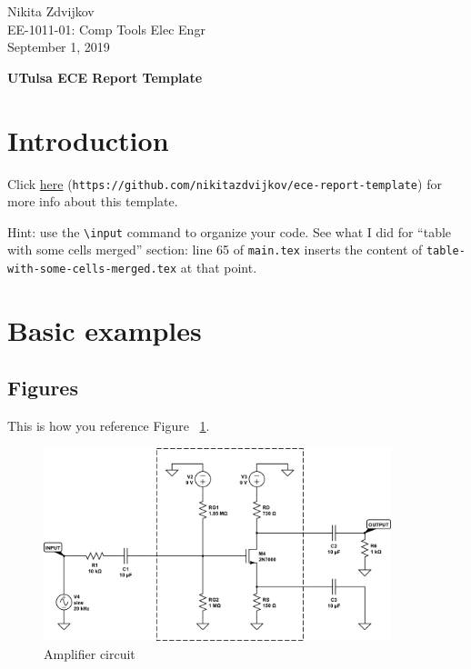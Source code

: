\documentclass[letterpaper,twoside,notitlepage,12pt]{article}
\begin{document}
\noindent
Nikita Zdvijkov \\
EE-1011-01: Comp Tools Elec Engr \\
September 1, 2019

\begin{center}
\large{\textbf{UTulsa ECE Report Template}}
\end{center}

\section{Introduction}

Click \href{https://github.com/nikitazdvijkov/ece-report-template}{here} (\texttt{https://github.com/nikitazdvijkov/ece-report-template}) for more info about this template.

Hint: use the \texttt{\textbackslash input{}} command to organize your code. See what I did for ``table with some cells merged'' section: line 65 of \texttt{main.tex} inserts the content of \texttt{table-with-some-cells-merged.tex} at that point.

\section{Basic examples}

\subsection{Figures}

This is how you reference Figure ~\ref{fig:circuit2}.

\begin{figure}[H]
\begin{center}
\includegraphics[width=0.9\textwidth]{circuit.png}
\end{center}
\caption{Amplifier circuit}
\label{fig:circuit2}
\end{figure}
\end{document}
